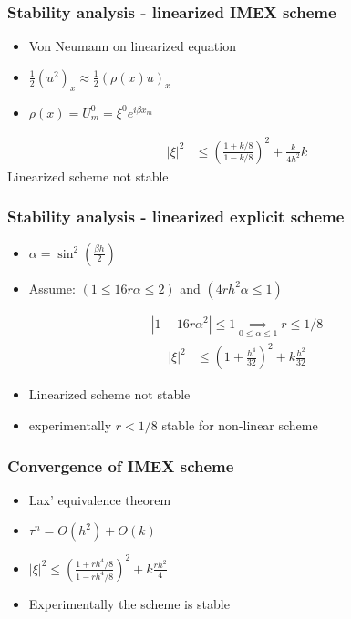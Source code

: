 \documentclass[screen]{beamer}
\begin{document}
\begin{frame}

\frametitle{Stability analysis - linearized IMEX scheme}
\begin{itemize}
\item Von Neumann on linearized equation \\
\item $\frac{1}{2}(u^2)_x \approx \frac{1}{2}(\rho(x)u)_x$ \\
\item $\rho(x) = U^0_m = \xi^0 e^{i\beta x_m}$ 
\end{itemize}


\begin{align*}
|\xi |^2 &\le \left(\frac{1+k/8}{1-k/8}\right)^2 + \frac{k}{4h^2}k
\end{align*}
Linearized scheme not stable

\end{frame}


\begin{frame}
\frametitle{Stability analysis - linearized explicit scheme}

\begin{itemize}
\item $\alpha = \sin^2(\frac{\beta h}{2})$
\item Assume: $(1 \le 16r\alpha \le 2)$ and $(4rh^2\alpha \le 1)$
\end{itemize}

\begin{align*}
 \left| 1-16r\alpha^2\right| \le 1 \underset{0\le \alpha\le 1}{\implies}  r \le 1/8 
\end{align*} 
\begin{align*}
|\xi |^2 &\le \left(1 + \frac{h^4}{32}\right)^2 + k\frac{h^2}{32} 
\end{align*}

\begin{itemize}
\item Linearized scheme not stable
\item experimentally $r < 1/8$ stable for non-linear scheme
\end{itemize}
\end{frame}


\begin{frame}
\frametitle{Convergence of IMEX scheme}

\begin{itemize}
\item Lax' equivalence theorem
\item $\tau ^n = O(h^2) + O(k) $
\item $|\xi |^2 \le \left(\frac{1+rh^4/8}{1-rh^4/8}\right)^2 + k\frac{rh^2}{4}$
\item Experimentally the scheme is stable
\end{itemize}

\end{frame}
\end{document}
